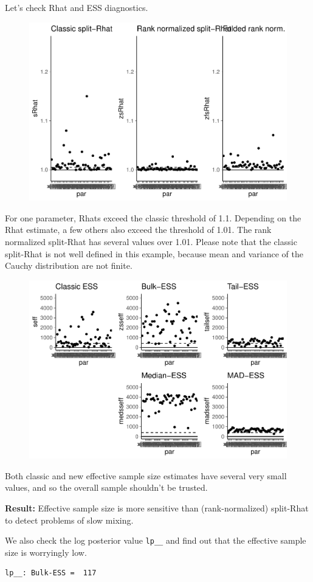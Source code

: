 \documentclass[american,]{article}
\begin{document}
Let's check Rhat and ESS diagnostics.

\begin{figure}[t]
  \centering
  \includegraphics[width=0.6\linewidth]{graphics/rhat-fit-nom-1.pdf}
\end{figure}

For one parameter, Rhats exceed the classic threshold of 1.1. Depending
on the Rhat estimate, a few others also exceed the threshold of 1.01.
The rank normalized split-Rhat has several values over 1.01. Please note
that the classic split-Rhat is not well defined in this example, because
mean and variance of the Cauchy distribution are not finite.

\begin{figure}[t]
  \centering
  \includegraphics[width=0.6\linewidth]{graphics/ess-fit-nom-1.pdf}
\end{figure}

Both classic and new effective sample size estimates have several very
small values, and so the overall sample shouldn't be trusted.

\textbf{Result:} Effective sample size is more sensitive than
(rank-normalized) split-Rhat to detect problems of slow mixing.

We also check the log posterior value \texttt{lp\_\_} and find out that
the effective sample size is worryingly low.

\begin{verbatim}
lp__: Bulk-ESS =  117
\end{verbatim}
\end{document}
